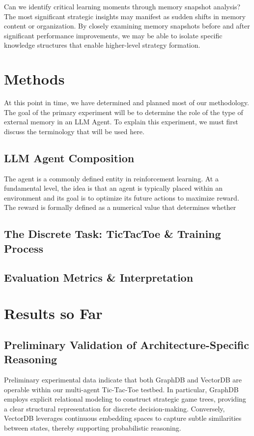 \documentclass{article}
\begin{document}
Can we identify critical learning moments through memory snapshot analysis? The most significant strategic insights may manifest as sudden shifts in memory content or organization. By closely examining memory snapshots before and after significant performance improvements, we may be able to isolate specific knowledge structures that enable higher-level strategy formation.

\section{Methods}
At this point in time, we have determined and planned most of our methodology. The goal of the primary experiment will be to determine the role of the type of external memory in an LLM Agent. To explain this experiment, we must first discuss the terminology that will be used here.

\subsection{LLM Agent Composition}
The agent is a commonly defined entity in reinforcement learning. At a fundamental level, the idea is that an agent is typically placed within an environment and its goal is to optimize its future actions to maximize reward. The reward is formally defined as a numerical value that determines whether 

\subsection{The Discrete Task: TicTacToe \& Training Process}

\subsection{Evaluation Metrics \& Interpretation}

\section{Results so Far}

\subsection{Preliminary Validation of Architecture-Specific Reasoning}
Preliminary experimental data indicate that both GraphDB and VectorDB are operable within our multi-agent Tic-Tac-Toe testbed. In particular, GraphDB employs explicit relational modeling to construct strategic game trees, providing a clear structural representation for discrete decision-making. Conversely, VectorDB leverages continuous embedding spaces to capture subtle similarities between states, thereby supporting probabilistic reasoning.
\end{document}
